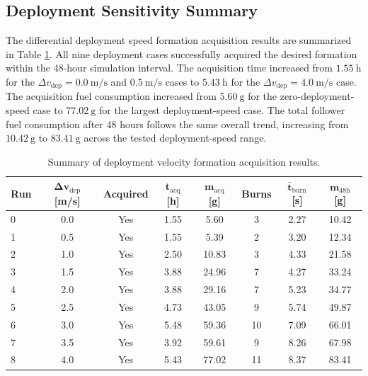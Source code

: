 \subsection{Deployment Sensitivity Summary}

The differential deployment speed formation acquisition results are summarized in Table \ref{tab:deployment_velocity_acquisition_summary}. All nine deployment cases successfully acquired the desired formation within the 48-hour simulation interval. The acquisition time increased from $1.55~\mathrm{h}$ for the $\Delta v_{\mathrm{dep}} = 0.0~\mathrm{m/s}$ and $0.5~\mathrm{m/s}$ cases to $5.43~\mathrm{h}$ for the $\Delta v_{\mathrm{dep}} = 4.0~\mathrm{m/s}$ case. The acquisition fuel consumption increased from $5.60~\mathrm{g}$ for the zero-deployment-speed case to $77.02~\mathrm{g}$ for the largest deployment-speed case. The total follower fuel consumption after 48 hours follows the same overall trend, increasing from $10.42~\mathrm{g}$ to $83.41~\mathrm{g}$ across the tested deployment-speed range.

\begin{table}[H]
    \centering
    \caption{Summary of deployment velocity formation acquisition results.}
    \label{tab:deployment_velocity_acquisition_summary}
    \begin{tabular}{lccccccc}
        \toprule
        \textbf{Run} &
        $\boldsymbol{\Delta v_{\mathrm{dep}}}$ \textbf{[m/s]} &
        \textbf{Acquired} &
        $\boldsymbol{t_{\mathrm{acq}}}$ \textbf{[h]} &
        $\boldsymbol{m_{\mathrm{acq}}}$ \textbf{[g]} &
        \textbf{Burns} &
        $\boldsymbol{\bar{t}_{\mathrm{burn}}}$ \textbf{[s]} &
        $\boldsymbol{m_{\mathrm{48h}}}$ \textbf{[g]} \\
        \midrule
        0 & 0.0 & Yes & 1.55 & 5.60  & 3  & 2.27 & 10.42 \\
        1 & 0.5 & Yes & 1.55 & 5.39  & 2  & 3.20 & 12.34 \\
        2 & 1.0 & Yes & 2.50 & 10.83 & 3  & 4.33 & 21.58 \\
        3 & 1.5 & Yes & 3.88 & 24.96 & 7  & 4.27 & 33.24 \\
        4 & 2.0 & Yes & 3.88 & 29.16 & 7  & 5.23 & 34.77 \\
        5 & 2.5 & Yes & 4.73 & 43.05 & 9  & 5.74 & 49.87 \\
        6 & 3.0 & Yes & 5.48 & 59.36 & 10 & 7.09 & 66.01 \\
        7 & 3.5 & Yes & 3.92 & 59.61 & 9  & 8.26 & 67.98 \\
        8 & 4.0 & Yes & 5.43 & 77.02 & 11 & 8.37 & 83.41 \\
        \bottomrule
    \end{tabular}
\end{table}

